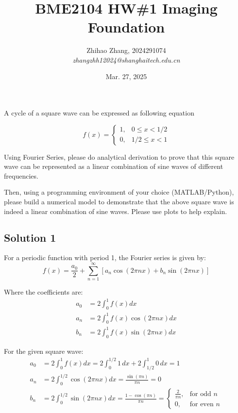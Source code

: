\documentclass[12pt, a4paper, oneside]{ctexart}
\begin{document}
\title{BME2104 HW\#1\textbf{
		Imaging Foundation}}

\author{Zhihao Zhang, 2024291074\\ \textit{zhangzhh12024@shanghaitech.edu.cn}}
\date{Mar. 27, 2025}
\maketitle

\begin{problem}

A cycle of a square wave can be expressed as following equation

\[f(x)=\left\{\begin{array}{cc}1,&0\leq x<1/2\\0,&1/2\leq x<1\end{array}\right.\]

Using Fourier Series, please do analytical derivation to prove that this square wave can be represented as a linear combination of sine waves of different frequencies.

Then, using a programming environment of your choice (MATLAB/Python), please build a numerical model to demonstrate that the above square wave is indeed a linear combination of sine waves. Please use plots to help explain.

\end{problem}
\subsection*{Solution 1}

For a periodic function with period 1, the Fourier series is given by:
\[f(x) = \frac{a_0}{2} + \sum_{n=1}^{\infty} [a_n \cos(2\pi n x) + b_n \sin(2\pi n x)]\]

Where the coefficients are:
\begin{align}
	a_0 & = 2\int_0^1 f(x)dx              \\
	a_n & = 2\int_0^1 f(x)\cos(2\pi nx)dx \\
	b_n & = 2\int_0^1 f(x)\sin(2\pi nx)dx
\end{align}

For the given square wave:
\begin{align}
	a_0 & = 2\int_0^1 f(x)dx = 2\int_0^{1/2} 1\,dx + 2\int_{1/2}^1 0\,dx = 1                                       \\
	a_n & = 2\int_0^{1/2} \cos(2\pi n x)dx = \frac{\sin(\pi n)}{\pi n} = 0                                         \\
	b_n & = 2\int_0^{1/2} \sin(2\pi n x)dx = \frac{1 - \cos(\pi n)}{\pi n} = \begin{cases}
		                                                                         \frac{2}{\pi n}, & \text{for odd } n  \\
		                                                                         0,               & \text{for even } n
	                                                                         \end{cases}
\end{align}
\end{document}
